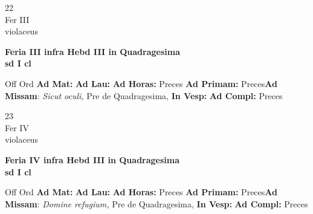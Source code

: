 \documentclass[10pt, openany]{book}
\begin{document}
        \begin{center}
            \begin{minipage}{3.5in}
                \vspace{2em}
                \begin{minipage}{0.5in}
                    {\Huge 22} \\
                    {\normalsize Fer III} \\
                    {\normalsize violaceus}
                \end{minipage}
                \begin{minipage}{3.0in}
                    \textbf{ \large Feria III infra Hebd III in Quadragesima \\
                    \textnormal{\normalsize sd I cl}} \\ 
                \end{minipage}
                \begin{justify}Off Ord
                    \textbf{Ad Mat: }
                    \textbf{Ad Lau: }
                    \textbf{Ad Horas: }Preces
                    \textbf{Ad Primam: }Preces\textbf{Ad Missam}: \textit{Sicut oculi,} Pre de Quadragesima,  
                    \textbf{In Vesp: }
                    \textbf{Ad Compl: }Preces
                \end{justify}
            \end{minipage}
        \end{center}
    
        \begin{center}
            \begin{minipage}{3.5in}
                \vspace{2em}
                \begin{minipage}{0.5in}
                    {\Huge 23} \\
                    {\normalsize Fer IV} \\
                    {\normalsize violaceus}
                \end{minipage}
                \begin{minipage}{3.0in}
                    \textbf{ \large Feria IV infra Hebd III in Quadragesima \\
                    \textnormal{\normalsize sd I cl}} \\ 
                \end{minipage}
                \begin{justify}Off Ord
                    \textbf{Ad Mat: }
                    \textbf{Ad Lau: }
                    \textbf{Ad Horas: }Preces
                    \textbf{Ad Primam: }Preces\textbf{Ad Missam}: \textit{Domine refugium,} Pre de Quadragesima,  
                    \textbf{In Vesp: }
                    \textbf{Ad Compl: }Preces
                \end{justify}
            \end{minipage}
        \end{center}
    
\end{document}
